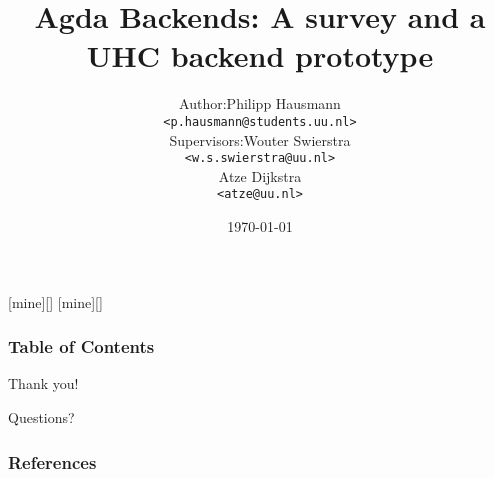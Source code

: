 \documentclass{beamer}
\title[Agda UHC Backend]{Agda Backends: A survey and a UHC backend prototype}
\date{\today}
\institute[Utrecht University] {
    Department of Information and Computing Sciences \\
    Utrecht University
}
\begin{document}
    \author[P. Hausmann]{
        \begin{tabular}{r@{ }l}
            Author:     & Philipp Hausmann \\
                        & \small{\texttt{<p.hausmann@students.uu.nl>}} \\[2ex]
            Supervisors: & Wouter Swierstra \\
                        & \small{\texttt{<w.s.swierstra@uu.nl>}} \\
                        & Atze Dijkstra \\
                        & \small{\texttt{<atze@uu.nl>}}
        \end{tabular}
    }

    [mine][]
    [mine][]

    \begin{frame}
        \titlepage
    \end{frame}

    \begin{frame}
        \frametitle{Table of Contents}
        \tableofcontents
    \end{frame}



    
    
    
%    
%    
%    
%    
%    


    \begin{frame}[plain]
        \begin{center}
            \par{\Huge{Thank you!}}
            \vspace{\baselineskip}
            \par{\Huge{Questions?}}


        \end{center}
    \end{frame}

    \begin{frame}[allowframebreaks]
        \frametitle{References}
        
        {}
    \end{frame}
\end{document}
